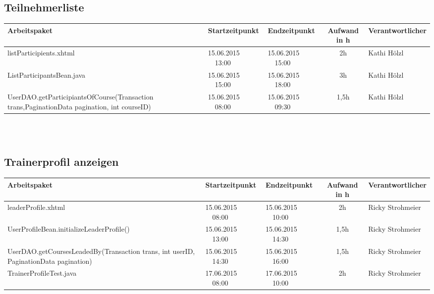 \begin{landscape}
	\subsection{Teilnehmerliste}
	\begin{tabular}{|p{10.3cm}|p{3.2cm}|p{3.2cm}|c|p{3.5cm}|}
		\hline  \textbf{Arbeitspaket} & \textbf{Startzeitpunkt} & \textbf{Endzeitpunkt} & \textbf{Aufwand in h} & \textbf{Verantwortlicher} \\ 
		\hline   listParticipients.xhtml                                    & 15.06.2015 \ \ 13:00     & 15.06.2015 \ \ 15:00     &      2h               & Kathi Hölzl\\
		\hline   ListParticipantsBean.java                                  & 15.06.2015 \ \ 15:00     & 15.06.2015 \ \ 18:00     &      3h               & Kathi Hölzl\\
		\hline   UserDAO.getParticipiantsOfCourse(Transaction trans,PaginationData pagination, int courseID)  & 15.06.2015 \ \ 08:00     & 15.06.2015 \ \ 09:30     &      1,5h               & Kathi Hölzl\\
		\hline 
	\end{tabular} \ \\
	\ \\
	
	\subsection{Trainerprofil anzeigen}	
	\begin{tabular}{|p{10.3cm}|p{3.2cm}|p{3.2cm}|c|p{3.5cm}|}
		\hline  \textbf{Arbeitspaket} & \textbf{Startzeitpunkt} & \textbf{Endzeitpunkt} & \textbf{Aufwand in h} & \textbf{Verantwortlicher} \\ 
		\hline   leaderProfile.xhtml                      & 15.06.2015 \ \ 08:00        & 15.06.2015 \ \ 10:00        &  2h                 & Ricky Strohmeier\\
		\hline   UserProfileBean.initializeLeaderProfile()& 15.06.2015 \ \ 13:00        & 15.06.2015 \ \ 14:30        &  1,5h                 & Ricky Strohmeier\\
		\hline   UserDAO.getCoursesLeadedBy(Transaction trans, int userID, PaginationData pagination)  & 15.06.2015 \ \ 14:30        & 15.06.2015 \ \ 16:00        &  1,5h                 & Ricky Strohmeier\\
		\hline   TrainerProfileTest.java  & 17.06.2015 \ \ 08:00        & 17.06.2015 \ \ 10:00        &  2h                 & Ricky Strohmeier\\
		\hline 
	\end{tabular} \ \\
	\ \\
	

\end{landscape}
